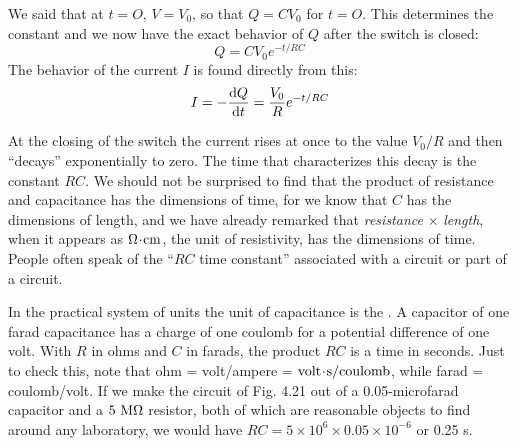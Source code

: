 We said that at $t = O$, $V = V_0$, so that $Q = CV_0$ for $t = O$. This
determines the constant and we now have the exact behavior of $Q$
after the switch is closed:
\begin{equation}
  Q = CV_0 e^{-t/RC}
\end{equation}
The behavior of the current $I$ is found directly from this:
\begin{equation}
  I = -\frac{\operatorname{d\!} Q}{\operatorname{d\!} t} = \frac{V_0}{R} e^{-t/RC}
\end{equation}

At the closing of the switch the current rises at once to the value
$V_0/R$ and then ``decays'' exponentially to zero. The time that characterizes
this decay is the constant $RC$. We should not be surprised to
find that the product of resistance and capacitance has the dimensions
of time, for we know that $C$ has the dimensions of length, and
we have already remarked that \emph{resistance} $\times$ \emph{length}, when it appears
as $\Omega\!\cdot\!\textup{cm}$, the unit of resistivity, has the dimensions of time. People
often speak of the ``$RC$ time constant'' associated with a circuit or
part of a circuit.

In the practical system of units the unit of capacitance is the .
A capacitor of one farad capacitance has a charge of one coulomb
for a potential difference of one volt. With $R$ in ohms and $C$ in
farads, the product $RC$ is a time in seconds. Just to check this,
note that ohm = volt/ampere = $\textup{volt}\!\cdot\!\textup{s}/\textup{coulomb}$, while farad =
coulomb/volt. If we make the circuit of Fig. 4.21 out of a 0.05-microfarad
capacitor and a $5\ \zu{M}\ohmunit$ resistor, both of which are
reasonable objects to find around any laboratory, we would have
$RC = 5 \times 10^6 \times 0.05 \times 10^{-6}$ or 0.25 s.

